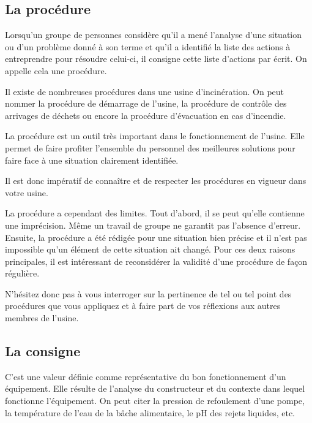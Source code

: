 \subsection{La procédure}

Lorsqu’un groupe de personnes considère qu’il a mené l’analyse d’une situation ou d’un problème donné à son terme et qu’il a identifié la liste des actions à entreprendre pour résoudre celui-ci, il consigne cette liste d’actions par écrit. On appelle cela une procédure.
\vspace{0.3cm}

Il existe de nombreuses procédures dans une usine d’incinération. On peut nommer la procédure de démarrage de l’usine, la procédure de contrôle des arrivages de déchets ou encore la procédure d’évacuation en cas d’incendie.
\vspace{0.3cm}

La procédure est un outil très important dans le fonctionnement de l’usine. Elle permet de faire profiter l’ensemble du personnel des meilleures solutions pour faire face à une situation clairement identifiée.
\vspace{0.3cm}

Il est donc impératif de connaître et de respecter les procédures en vigueur dans votre usine.
\vspace{0.3cm}

La procédure a cependant des limites. Tout d’abord, il se peut qu’elle contienne une imprécision. Même un travail de groupe ne garantit pas l’absence d’erreur. Ensuite, la procédure a été rédigée pour une situation bien précise et il n’est pas impossible qu’un élément de cette situation ait changé. Pour ces deux raisons principales, il est intéressant de reconsidérer la validité d’une procédure de façon régulière.
\vspace{0.3cm}

N’hésitez donc pas à vous interroger sur la pertinence de tel ou tel point des procédures que vous appliquez et à faire part de vos réflexions aux autres membres de l’usine.



\subsection{La consigne}

C’est une valeur définie comme représentative du bon fonctionnement d’un équipement. Elle résulte de l’analyse du constructeur et du contexte dans lequel fonctionne l’équipement. On peut citer la pression de refoulement d’une pompe, la température de l’eau de la bâche alimentaire, le pH des rejets liquides, etc.



